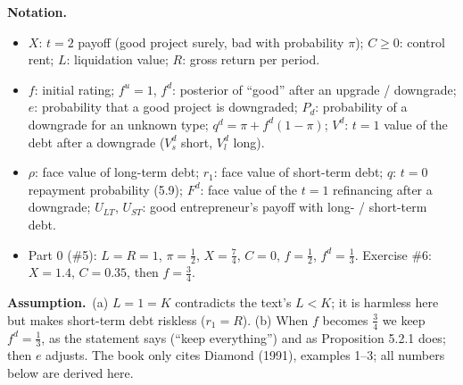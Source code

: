 \documentclass[11pt,a4paper]{article}
\newcommand{\notation}{\par\noindent\textbf{Notation.}}
\newcommand{\assume}{\par\smallskip\noindent\textbf{Assumption.}~}
\begin{document}
\notation
\begin{itemize}
  \item $X$: $t=2$ payoff (good project surely, bad with probability $\pi$); $C\ge0$: control rent; $L$: liquidation value; $R$: gross return per period.
  \item $f$: initial rating; $f^u=1$, $f^d$: posterior of ``good'' after an upgrade / downgrade; $e$: probability that a good project is downgraded;
        $P_d$: probability of a downgrade for an unknown type; $q^d=\pi+f^d(1-\pi)$; $V^d$: $t=1$ value of the debt after a downgrade ($V_s^d$ short, $V_l^d$ long).
  \item $\rho$: face value of long-term debt; $r_1$: face value of short-term debt; $q$: $t=0$ repayment probability (5.9);
        $F^d$: face value of the $t=1$ refinancing after a downgrade; $U_{LT}$, $U_{ST}$: good entrepreneur's payoff with long- / short-term debt.
  \item Part 0 (\#5): $L=R=1$, $\pi=\frac12$, $X=\frac74$, $C=0$, $f=\frac12$, $f^d=\frac13$. Exercise \#6: $X=1.4$, $C=0.35$, then $f=\frac34$.
\end{itemize}
\assume (a) $L=1=K$ contradicts the text's $L<K$; it is harmless here but makes short-term debt riskless ($r_1=R$).
(b) When $f$ becomes $\frac34$ we keep $f^d=\frac13$, as the statement says (``keep everything'') and as Proposition 5.2.1 does; then $e$ adjusts.
The book only cites Diamond (1991), examples 1--3; all numbers below are derived here.
\end{document}
